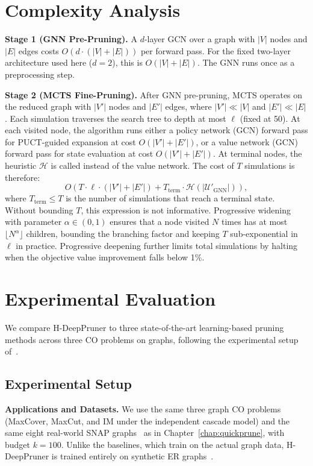 \section{Complexity Analysis}

\textbf{Stage 1 (GNN Pre-Pruning).} A $d$-layer GCN over a graph with $|V|$ nodes and
$|E|$ edges costs $O(d \cdot (|V| + |E|))$ per forward pass. For the fixed two-layer
architecture used here ($d = 2$), this is $O(|V| + |E|)$. The GNN runs once as a
preprocessing step.

\textbf{Stage 2 (MCTS Fine-Pruning).} After GNN pre-pruning, MCTS operates on the
reduced graph with $|V'|$ nodes and $|E'|$ edges, where $|V'| \ll |V|$ and $|E'| \ll
|E|$. Each simulation traverses the search tree to depth at most $\ell$ (fixed at 50).
At each visited node, the algorithm runs either a policy network (GCN) forward pass for
PUCT-guided expansion at cost $O(|V'| + |E'|)$, or a value network (GCN) forward pass
for state evaluation at cost $O(|V'| + |E'|)$. At terminal nodes, the heuristic
$\mathcal{H}$ is called instead of the value network. The cost of $T$ simulations is
therefore:
\[
  O\!\left(T \cdot \ell \cdot (|V'|+|E'|) + T_{\text{term}} \cdot \mathcal{H}(|\mathcal{U}'_{\text{GNN}}|)\right),
\]
where $T_{\text{term}} \leq T$ is the number of simulations that reach a terminal state.
Without bounding $T$, this expression is not informative. Progressive widening with
parameter $\alpha \in (0,1)$ ensures that a node visited $N$ times has at most
$\lfloor N^\alpha \rfloor$ children, bounding the branching factor and keeping $T$
sub-exponential in $\ell$ in practice. Progressive deepening further limits total
simulations by halting when the objective value improvement falls below 1\%.

\section{Experimental Evaluation}

We compare H-DeepPruner to three state-of-the-art learning-based pruning methods across
three CO problems on graphs, following the experimental setup
of~\citep{ireland2022lense}.

\subsection{Experimental Setup}

\textbf{Applications and Datasets.} We use the same three graph CO problems (MaxCover,
MaxCut, and IM under the independent cascade model) and the same eight
real-world SNAP graphs~\citep{leskovec2016snap} as in Chapter~\ref{chap:quickprune}, with budget $k = 100$.
Unlike the baselines, which train on the actual graph data, H-DeepPruner is trained
entirely on synthetic ER graphs~\citep{erdos1960evolution}.

